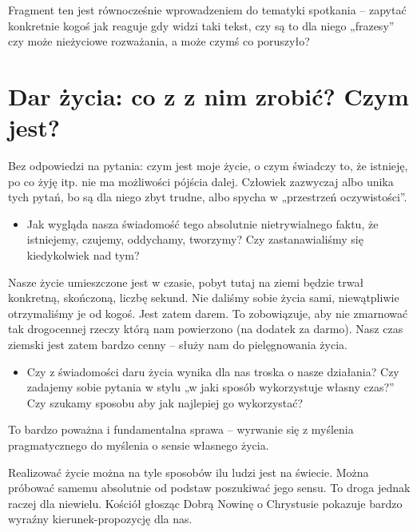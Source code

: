 \documentclass[a5paper,10pt,polish]{book}
\begin{document}
Fragment ten jest równocześnie wprowadzeniem do tematyki spotkania – zapytać konkretnie kogoś jak reaguje gdy widzi taki tekst, czy są to dla niego „frazesy” czy może nieżyciowe rozważania, a może czymś co poruszyło?


\section{Dar  życia: co z z nim zrobić? Czym  jest?}
\label{miliardowice-2005-jesien/spotkanie1:dar-zycia-co-z-z-nim-zrobic-czym-jest}
Bez odpowiedzi na pytania: czym jest moje życie, o czym świadczy to, że istnieję, po co żyję itp. nie ma możliwości pójścia dalej. Człowiek zazwyczaj albo unika tych pytań, bo są dla niego zbyt trudne, albo spycha w „przestrzeń oczywistości”.
\begin{itemize}
\item {} 
Jak wygląda nasza świadomość tego absolutnie nietrywialnego faktu, że istniejemy, czujemy, oddychamy, tworzymy? Czy zastanawialiśmy się kiedykolwiek nad tym?

\end{itemize}

Nasze życie umieszczone jest w czasie, pobyt tutaj na ziemi będzie trwał konkretną, skończoną, liczbę sekund. Nie daliśmy sobie życia sami, niewątpliwie otrzymaliśmy je od kogoś. Jest zatem darem. To zobowiązuje, aby nie zmarnować tak drogocennej rzeczy którą nam powierzono (na dodatek za darmo). Nasz czas ziemski jest zatem bardzo cenny – służy nam do pielęgnowania życia.
\begin{itemize}
\item {} 
Czy z świadomości daru życia wynika dla nas troska o nasze działania? Czy zadajemy sobie pytania w stylu „w jaki sposób wykorzystuje własny czas?” Czy szukamy sposobu aby jak najlepiej go wykorzystać?

\end{itemize}

To bardzo poważna i fundamentalna sprawa – wyrwanie się z myślenia pragmatycznego do myślenia o sensie własnego życia.

Realizować życie można na tyle sposobów ilu ludzi jest na świecie. Można próbować samemu absolutnie od podstaw poszukiwać jego sensu. To droga jednak raczej dla niewielu. Kościół głosząc Dobrą Nowinę o Chrystusie pokazuje bardzo wyraźny kierunek-propozycję dla nas.
\end{document}
